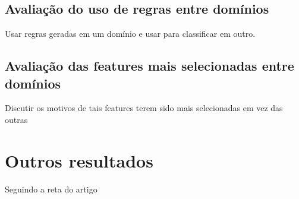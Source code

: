 \subsection{Avaliação do uso de regras entre domínios}

Usar regras geradas em um domínio e usar para classificar em outro.

\subsection{Avaliação das features mais selecionadas entre domínios}

Discutir os motivos de tais features terem sido mais selecionadas em vez das outras

\section{Outros resultados}

Seguindo a reta do artigo
